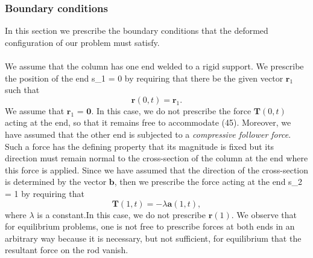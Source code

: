 
\subsubsection{Boundary conditions}
In this section we prescribe the boundary conditions that the deformed configuration of our problem must satisfy.\\\\
We assume that the column has one end welded to a rigid support. We prescribe the position of the end s_1 = 0 by requiring that there be the given vector $\mathbf{r}_1$ such that
\[ \mathbf{r}(0,t) = \mathbf{r}_1.\]
We assume that $\mathbf{r}_1$ = $\mathbf{0}.$
In this case, we do not prescribe the force $\mathbf{T}(0,t)$ acting at the end, so that it remains free to accommodate (45). Moreover, we have assumed that the other end is subjected to a \emph{compressive follower force}. Such a force has the defining property that its magnitude is fixed but its direction must remain normal to the cross-section of the column at the end where this force is applied. Since we have assumed that the direction of the cross-section is determined by the vector $\mathbf{b}$, then we prescribe the force acting at the end s_2 = 1 by requiring that 
\[ \mathbf{T}(1,t) = -\lambda \mathbf{a}(1,t), \]
where $\lambda$ is a constant.In this case, we do not prescribe $\mathbf{r}(1).$ We observe that for equilibrium problems, one is not free to prescribe forces at both ends in an arbitrary way because it is necessary, but not sufficient, for equilibrium that the resultant force on the rod vanish.



